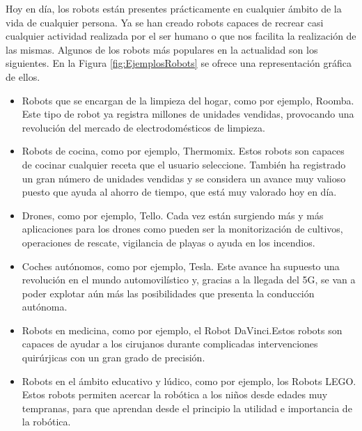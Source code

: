 Hoy en día, los robots están presentes prácticamente en cualquier ámbito de la vida de cualquier persona. Ya se han creado robots capaces de recrear casi cualquier actividad realizada por el ser humano o que nos facilita la realización de las mismas. Algunos de los robots más populares en la actualidad son los siguientes. En la Figura \ref{fig:EjemplosRobots} se ofrece una representación gráfica de ellos.

\begin{itemize}
\item Robots que se encargan de la limpieza del hogar, como por ejemplo, Roomba. Este tipo de robot ya registra millones de unidades vendidas, provocando una revolución del mercado de electrodomésticos de limpieza.
\item Robots de cocina, como por ejemplo, Thermomix. Estos robots son capaces de cocinar cualquier receta que el usuario seleccione. También ha registrado un gran número de unidades vendidas y se considera un avance muy valioso puesto que ayuda al ahorro de tiempo, que está muy valorado hoy en día.
\item Drones, como por ejemplo, Tello. Cada vez están surgiendo más y más aplicaciones para los drones como pueden ser la monitorización de cultivos, operaciones de rescate, vigilancia de playas o ayuda en los incendios.
\item Coches autónomos, como por ejemplo, Tesla. Este avance ha supuesto una revolución en el mundo automovilístico y, gracias a la llegada del 5G, se van a poder explotar aún más las posibilidades que presenta la conducción autónoma.
\item Robots en medicina, como por ejemplo, el Robot DaVinci.Estos robots son capaces de ayudar a los cirujanos durante complicadas intervenciones quirúrjicas con un gran grado de precisión.
\item Robots en el ámbito educativo y lúdico, como por ejemplo, los Robots LEGO. Estos robots permiten acercar la robótica a los niños desde edades muy tempranas, para que aprendan desde el principio la utilidad e importancia de la robótica.
\end{itemize} 

